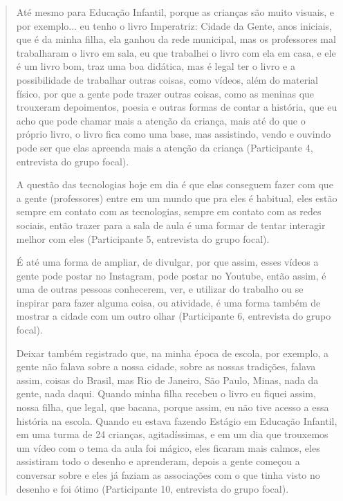\documentclass[portuguese]{textolivre}
\begin{document}
\begin{quote}
    Até mesmo para Educação Infantil, porque as crianças são muito visuais, e por exemplo... eu tenho o livro Imperatriz: Cidade da Gente, anos iniciais, que é da minha filha, ela ganhou da rede municipal, mas os professores mal trabalharam o livro em sala, eu que trabalhei o livro com ela em casa, e ele é um livro bom, traz uma boa didática, mas é legal ter o livro e a possibilidade de trabalhar outras coisas, como vídeos, além do material físico, por que a gente pode trazer outras coisas, como as meninas que trouxeram depoimentos, poesia e outras formas de contar a história, que eu acho que pode chamar mais a atenção da criança, mais até do que o próprio livro, o livro fica como uma base, mas assistindo, vendo e ouvindo pode ser que elas apreenda mais a atenção da criança (Participante 4, entrevista do grupo focal).

    A questão das tecnologias hoje em dia é que elas conseguem fazer com que a gente (professores) entre em um mundo que pra eles é habitual, eles estão sempre em contato com as tecnologias, sempre em contato com as redes sociais, então trazer para a sala de aula é uma formar de tentar interagir melhor com eles (Participante 5, entrevista do grupo focal).

    É até uma forma de ampliar, de divulgar, por que assim, esses vídeos a gente pode postar no Instagram, pode postar no Youtube, então assim, é uma de outras pessoas conhecerem, ver, e utilizar do trabalho ou se inspirar para fazer alguma coisa, ou atividade, é uma forma também de mostrar a cidade com um outro olhar (Participante 6, entrevista do grupo focal).

    Deixar também registrado que, na minha época de escola, por exemplo, a gente não falava sobre a nossa cidade, sobre as nossas tradições, falava assim, coisas do Brasil, mas Rio de Janeiro, São Paulo, Minas, nada da gente, nada daqui. Quando minha filha recebeu o livro eu fiquei assim, nossa filha, que legal, que bacana, porque assim, eu não tive acesso a essa história na escola. Quando eu estava fazendo Estágio em Educação Infantil, em uma turma de 24 crianças, agitadíssimas, e em um dia que trouxemos um vídeo com o tema da aula foi mágico, eles ficaram mais calmos, eles assistiram todo o desenho e aprenderam, depois a gente começou a conversar sobre e eles já faziam as associações com o que tinha visto no desenho e foi ótimo (Participante 10, entrevista do grupo focal).
    \end{quote}
\end{document}
